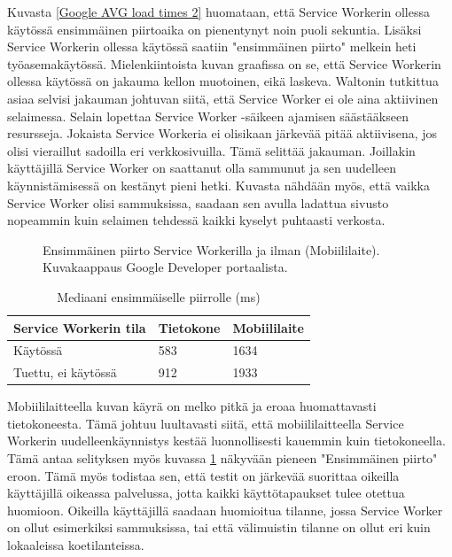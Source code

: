 \documentclass{tktltiki}
\begin{document}
Kuvasta \ref{Google AVG load times 2} huomataan, että Service Workerin ollessa käytössä ensimmäinen piirtoaika on pienentynyt noin puoli sekuntia. Lisäksi Service Workerin ollessa käytössä saatiin "ensimmäinen piirto" melkein heti työasemakäytössä. Mielenkiintoista kuvan graafissa on se, että Service Workerin ollessa käytössä on jakauma kellon muotoinen, eikä laskeva. Waltonin tutkittua asiaa selvisi jakauman johtuvan siitä, että Service Worker ei ole aina aktiivinen selaimessa. Selain lopettaa Service Worker -säikeen ajamisen säästääkseen resursseja. Jokaista Service Workeria ei olisikaan järkevää pitää aktiivisena, jos olisi vieraillut sadoilla eri verkkosivuilla. Tämä selittää jakauman. Joillakin käyttäjillä Service Worker on saattanut olla sammunut ja sen uudelleen käynnistämisessä on kestänyt pieni hetki. Kuvasta  nähdään myös, että vaikka Service Worker olisi sammuksissa, saadaan sen avulla ladattua sivusto nopeammin kuin selaimen tehdessä kaikki kyselyt puhtaasti verkosta. 

\clearpage

\begin{figure}[h]
\begin{center}
\caption{Ensimmäinen piirto Service Workerilla ja ilman (Mobiililaite). Kuvakaappaus Google Developer portaalista.}
\label{Google AVG load times 3}
\end{center}
\end{figure}

\begin{table}[h]
\centering
\begin{small}
\caption{Mediaani ensimmäiselle piirrolle (ms) }
\begin{tabular}{|L{5cm}|L{5cm}|L{5cm}|}
\hline
\textbf{Service Workerin tila} & 
\textbf{Tietokone} &
\textbf{Mobiililaite}
\\ \hline
Käytössä & 
583 &
1634
\\ \hline
Tuettu, ei käytössä &
912 &
1933
\\ \hline
\end{tabular}
\label{table:median first paint}
\end{small}
\end{table}

Mobiililaitteella kuvan käyrä on melko pitkä ja eroaa huomattavasti tietokoneesta. Tämä johtuu luultavasti siitä, että mobiililaitteella Service Workerin uudelleenkäynnistys kestää luonnollisesti kauemmin kuin tietokoneella. Tämä antaa selityksen myös kuvassa \ref{Google AVG load times 3} näkyvään pieneen "Ensimmäinen piirto" eroon. Tämä myös todistaa sen, että testit on järkevää suorittaa oikeilla käyttäjillä oikeassa palvelussa, jotta kaikki käyttötapaukset tulee otettua huomioon. Oikeilla käyttäjillä saadaan huomioitua tilanne, jossa Service Worker on ollut esimerkiksi sammuksissa, tai että välimuistin tilanne on ollut eri kuin lokaaleissa koetilanteissa.
\end{document}
